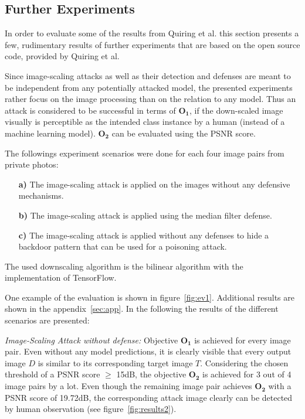 \documentclass[sigconf]{acmart}
\begin{document}
\subsection{Further Experiments}
\label{sec:fexp}
In order to evaluate some of the results from Quiring et al. this section presents a few, rudimentary results of further experiments that are based on the open source code, provided by Quiring et al.

Since image-scaling attacks as well as their detection and defenses are meant to be independent from any potentially attacked model, the presented experiments rather focus on the image processing than on the relation to any model.
Thus an attack is considered to be successful in terms of $\boldsymbol{O_1}$, if the down-scaled image visually is perceptible as the intended class instance by a human (instead of a machine learning model).
$\boldsymbol{O_2}$ can be evaluated using the PSNR score.

The followings experiment scenarios were done for each four image pairs from private photos:

\begin{itemize}
\item[\textbf{a)}] The image-scaling attack is applied on the images without any defensive mechanisms. 
\item[\textbf{b)}] The image-scaling attack is applied using the median filter defense.
\item[\textbf{c)}] The image-scaling attack is applied without any defenses to hide a backdoor pattern that can be used for a poisoning attack.
\end{itemize}

The used downscaling algorithm is the bilinear algorithm with the implementation of TensorFlow. 

One example of the evaluation is shown in figure~\ref{fig:ev1}.
Additional results are shown in the appendix~\ref{sec:app}.
In the following the results of the different scenarios are presented:

\smallbreak

\textit{Image-Scaling Attack without defense:}
Objective $\boldsymbol{O_1}$ is achieved for every image pair.
Even without any model predictions, it is clearly visible that every output image $D$ is similar to its corresponding target image $T$.
Considering the chosen threshold of a PSNR score $\geq$ 15dB, the objective $\boldsymbol{O_2}$ is achieved for 3 out of 4 image pairs by a lot.
Even though the remaining image pair achieves $\boldsymbol{O_2}$ with a PSNR score of 19.72dB, the corresponding attack image clearly can be detected by human observation (see figure~\ref{fig:results2}).
\end{document}
